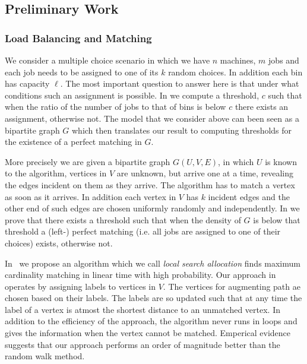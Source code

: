 \documentclass{scrartcl}
\begin{document}
\subsection{Preliminary Work}
\subsubsection{Load Balancing and Matching }
We consider a multiple choice scenario in which we have $n$ machines, $m$ jobs and each job needs to be assigned to one of its $k$ random choices. In addition each bin has capacity $\ell$.
The most important question to answer here is that under what conditions such an assignment is possible. 
In \cite{kCores} we compute a threshold, $c$ such that when the ratio of the number of jobs to that of bins is below $c$ there exists an assignment, otherwise not. The model that we consider above can been seen as a bipartite graph $G$ which then translates our result to computing thresholds for the existence of a perfect matching in $G$.

More precisely we are given a bipartite graph $G(U,V,E)$, in which $U$ is known to the algorithm, vertices in $V$ are
unknown, but arrive one at a time, revealing the edges incident on
them as they arrive. The algorithm has to match a vertex
as soon as it arrives. In addition each vertex in $V$ has $k$ incident edges and the other end of such edges are chosen uniformly randomly and independently. In \cite{kCores} we prove that there exists a threshold such that when the density of $G$ is below that threshold a (left-) perfect matching (i.e. all jobs are assigned to one of their choices) exists, otherwise not.

In~\cite{ballsbins} we propose an algorithm which we call \emph{local search allocation} finds maximum cardinality matching in linear time with high probability.
Our approach in~\cite{ballsbins} operates by assigning labels to vertices in $V$. The vertices for augmenting path ae chosen based on their labels. The labels are so updated such that at any time the label of a vertex is atmost the shortest distance to an unmatched vertex. In addition to the efficiency of the approach, the algorithm never runs in loops and gives the information when the vertex cannot be matched. Emperical evidence suggests that our approach performs an order of magnitude better than the random walk method.
\end{document}
